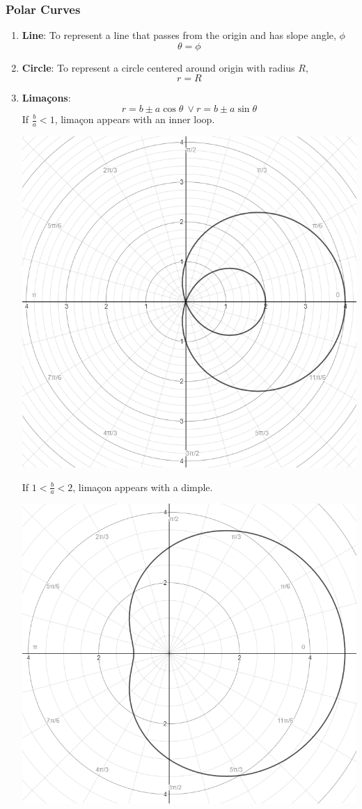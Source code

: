 \documentclass[12pt]{article}
\begin{document}
\subsubsection{Polar Curves}
\begin{enumerate}
\item \textbf{Line}: To represent a line that passes from the origin and has slope angle, $\phi$ $$\theta=\phi$$
\item \textbf{Circle}: To represent a circle centered around origin with radius $R$, $$r=R$$
\newpage
\item \textbf{Limaçons}: $$r = b \pm a \cos \theta \ \vee r= b \pm a \sin \theta$$
If $\frac{b}{a}<1$, limaçon appears with an inner loop.

\includegraphics[scale=0.7]{innerloop.png}

\newpage
If $1 < \frac{b}{a}<2$, limaçon appears with a dimple.

\includegraphics[scale=0.688]{dimple.png}


\end{enumerate}
\end{document}
